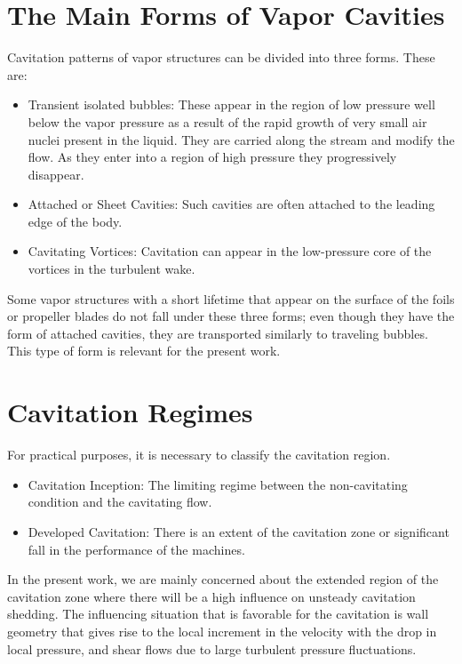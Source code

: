 \section{The Main Forms of Vapor Cavities}
Cavitation patterns of vapor structures can be divided into three
forms. These are:

\begin{itemize}
\item Transient isolated bubbles: These appear in the region of low
  pressure well below the vapor pressure as a result of the rapid
  growth of very small air nuclei present in the liquid. They are
  carried along the stream and modify the flow. As they enter into a
  region of high pressure they progressively disappear.
\item Attached or Sheet Cavities: Such cavities are often attached to
  the leading edge of the body.
\item Cavitating Vortices: Cavitation can appear in the low-pressure
  core of the vortices in the turbulent wake.
\end{itemize}

Some vapor structures with a short lifetime that appear on the surface
of the foils or propeller blades do not fall under these three forms;
even though they have the form of attached cavities, they are
transported similarly to traveling bubbles. This type of form is relevant for the present work.\\

\section{Cavitation Regimes}
For practical purposes, it is necessary to classify the cavitation
region.

\begin{itemize}
\item Cavitation Inception: The limiting regime between the
  non-cavitating condition and the cavitating flow.
\item Developed Cavitation: There is an extent of the
  cavitation zone or significant fall in the performance of the
  machines.
\end{itemize}

In the present work, we are mainly concerned about the extended region of the
cavitation zone where there will be a high influence on unsteady
cavitation shedding. The influencing situation that is favorable for
the cavitation is wall geometry that gives rise to the local
increment in the velocity with the drop in local pressure, and shear
flows due to large turbulent pressure fluctuations.\\

